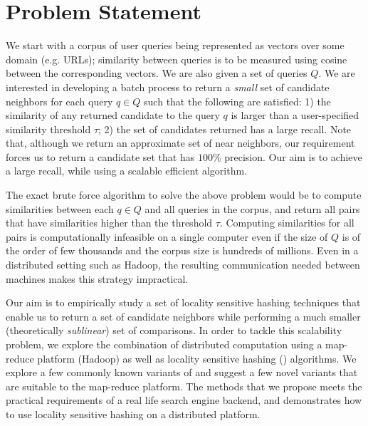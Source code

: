 
\section{Problem Statement}
We start with a corpus of user queries being represented as vectors
over some domain (e.g. URLs); similarity between queries is to be measured using cosine between the corresponding
vectors. We are also given a set of queries $Q$. 
We are interested in developing a batch process to return a \emph{small}
set of candidate neighbors for each query $q \in Q$ such that the following
are satisfied: 1) the similarity of any returned candidate to the query $q$ is larger than a user-specified 
similarity threshold $\tau$; 2) the set of candidates returned has a large recall. 
Note that, although we return an approximate set of near neighbors, our requirement forces us to 
return a candidate set that has $100\%$ precision. Our aim is to achieve a large recall, while using
a scalable efficient algorithm.

The exact brute force algorithm to solve the above problem would be to compute
similarities between each $q\in Q$ and all queries in the corpus, and return 
all pairs that have similarities higher than the threshold $\tau$. Computing similarities
for all pairs is computationally infeasible on a single computer even if the size of $Q$ is of the order of few thousands
and the corpus size is hundreds of millions. Even in a distributed setting such as Hadoop, the 
resulting communication needed between machines makes this strategy impractical. 

Our aim is to empirically study a set of locality sensitive hashing techniques
that enable us to return a set of candidate neighbors while performing
a much smaller (theoretically \emph{sublinear}) set of comparisons. 
In order to tackle this scalability problem, we explore the 
combination of distributed computation using a map-reduce platform (Hadoop) as well as
locality sensitive hashing (\lsh) algorithms. 
We explore a few commonly known variants of \lsh and suggest a few novel variants
that are suitable to the map-reduce platform. 
The methods that we propose meets the practical requirements of a real life 
search engine backend, and demonstrates how to use locality sensitive hashing
on a distributed platform. 




